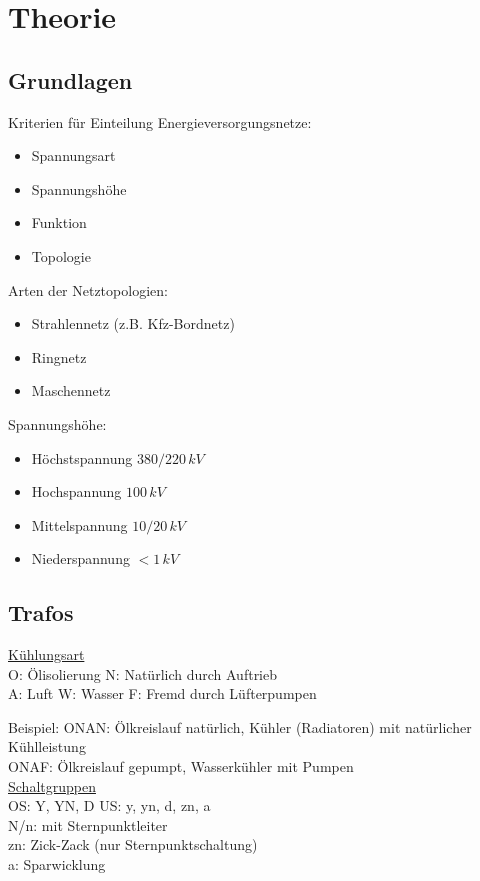 \newpage
\section{Theorie}
\subsection{Grundlagen}
Kriterien für Einteilung Energieversorgungsnetze:
\begin{itemize}
    \item Spannungsart \item Spannungshöhe \item Funktion \item Topologie
\end{itemize}

Arten der Netztopologien:
\begin{itemize}
\item Strahlennetz (z.B. Kfz-Bordnetz)
\item Ringnetz
\item Maschennetz
\end{itemize}

Spannungshöhe:
\begin{itemize}
    \item Höchstspannung $380/220 \, kV$
    \item Hochspannung $100 \, kV$
    \item Mittelspannung $10/20 \, kV$
    \item Niederspannung $<1 \, kV$
\end{itemize}

\subsection{Trafos}
\ul{Kühlungsart}\\
O: Ölisolierung \qquad N: Natürlich durch Auftrieb\\
A: Luft \qquad W: Wasser \qquad F: Fremd durch Lüfterpumpen

Beispiel: ONAN: Ölkreislauf natürlich, Kühler (Radiatoren) mit natürlicher Kühlleistung\\
ONAF: Ölkreislauf gepumpt, Wasserkühler mit Pumpen\\

\ul{Schaltgruppen}\\
OS: Y, YN, D \qquad US: y, yn, d, zn, a\\
N/n: mit Sternpunktleiter\\
zn: Zick-Zack (nur Sternpunktschaltung)\\
a: Sparwicklung

